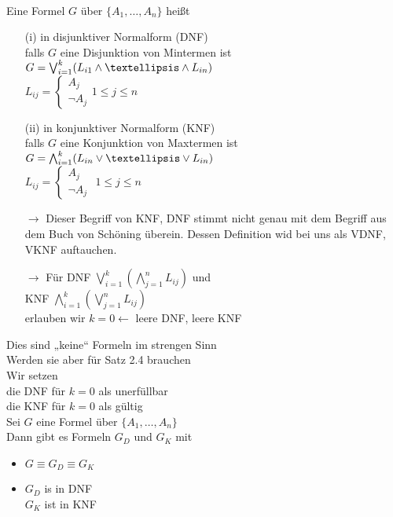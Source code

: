 \\
Eine Formel $G$ über $\{A_1, …, A_n\}$ heißt
\begin{enumerate}
\item[(i)] in disjunktiver Normalform (DNF)\\
falls $G$ eine Disjunktion von Mintermen ist\\
$G = \bigvee_{i=1}^k (L_{i1} \AND … \AND L_{in})$\\
$L_{ij} = \begin{cases} A_j \\ \neg A_j \end{cases} 1 \leq j \leq n$\\

\item[(ii)] in konjunktiver Normalform (KNF)\\
falls $G$ eine Konjunktion von Maxtermen ist\\
$G = \bigwedge_{i=1}^k (L_{in} \OR … \OR L_{in})$\\
$L_{ij} = \begin{cases} A_j \\ \neg A_j \end{cases}$ $1 \leq j \leq n$
\end{enumerate}

\bemerkung{}
\begin{itemize}
\item[$\rightarrow$] Dieser Begriff von KNF, DNF stimmt nicht genau mit dem Begriff aus dem Buch von Schöning überein. Dessen Definition wid bei uns als VDNF, VKNF auftauchen.
\item[$\rightarrow$] Für DNF $\bigvee_{i=1}^k ( \bigwedge_{j=1}^n L_{ij} )$ und \\
KNF $\bigwedge_{i=1}^k ( \bigvee_{j=1}^n L_{ij})$\\
erlauben wir $k=0 \leftarrow$ leere DNF, leere KNF
\end{itemize}
\noindent
Dies sind „keine“ Formeln im strengen Sinn\\
Werden sie aber für Satz 2.4 brauchen\\
Wir setzen\\
die DNF für $k=0$ als unerfüllbar\\
die KNF für $k=0$ als gültig\\

Sei $G$ eine Formel über $\{ A_1, …, A_n\}$\\
Dann gibt es Formeln $G_D$ und $G_K$ mit
\begin{itemize}
\item $G \equiv G_D \equiv G_K$
\item $G_D$ is in DNF\\
$G_K$ ist in KNF
\end{itemize}



